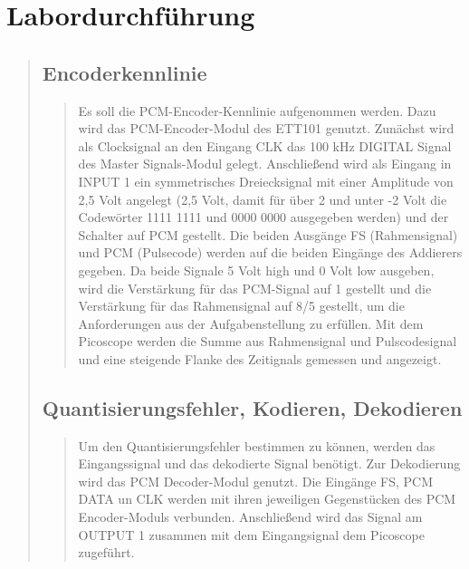 \section{Labordurchführung}
\begin{quote}
    
    
    \subsection{Encoderkennlinie}
    \begin{quote}
        
        Es soll die PCM-Encoder-Kennlinie aufgenommen werden.
        Dazu wird das PCM-Encoder-Modul des ETT101 genutzt. Zunächst wird als Clocksignal an den Eingang CLK das
        100 kHz DIGITAL Signal des Master Signals-Modul gelegt. Anschließend wird als Eingang in INPUT 1 ein
        symmetrisches Dreiecksignal mit einer Amplitude von 2,5 Volt angelegt (2,5 Volt, damit für über 2 und unter -2 Volt
        die Codewörter 1111 1111 und 0000 0000 ausgegeben werden) und der Schalter auf PCM gestellt.
        Die beiden Ausgänge FS (Rahmensignal) und PCM (Pulsecode) werden auf die beiden Eingänge des Addierers gegeben. Da
        beide Signale 5 Volt high und 0 Volt low ausgeben, wird die Verstärkung für das PCM-Signal auf 1 gestellt und
        die Verstärkung für das Rahmensignal auf 8/5 gestellt, um die Anforderungen aus der Aufgabenstellung zu erfüllen.
        Mit dem Picoscope werden die Summe aus Rahmensignal und Pulscodesignal und eine steigende Flanke des Zeitignals
        gemessen und angezeigt.
        
        
    \end{quote}
    
    \subsection{Quantisierungsfehler, Kodieren, Dekodieren}
    
    \begin{quote}
        
        Um den Quantisierungsfehler bestimmen zu können, werden das Eingangssignal und das dekodierte Signal benötigt. Zur
        Dekodierung wird das PCM Decoder-Modul genutzt. Die Eingänge FS, PCM DATA un CLK werden mit ihren jeweiligen
        Gegenstücken des PCM Encoder-Moduls verbunden. Anschließend wird das Signal am OUTPUT 1 zusammen mit dem
        Eingangsignal dem Picoscope zugeführt.\\
        
        
        
        
        
    \end{quote}
    
    
    
    
\end{quote}

